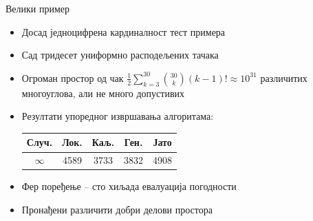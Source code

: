 \documentclass{beamer}
\begin{document}
\begin{frame}{Велики пример}
\begin{itemize}
\item Досад једноцифрена кардиналност тест примера

\item Сад тридесет униформно расподељених тачака

\item Огроман простор од чак $\frac{1}{2} \sum_{k=3}^{30} {30 \choose k} (k-1)! \approx 10^{31}$ различитих многоуглова, али не много допустивих

\item Резултати упоредног извршавања алгоритама:
\begin{center}
\begin{tabular}{| c c c c c |} \hline
Случ. & Лок. & Каљ. & Ген. & Јато\\ \hline
$\infty$ & 4589 & 3733 & 3832 & 4908\\ \hline
\end{tabular}
\end{center}

\item Фер поређење -- сто хиљада евалуација погодности

\item Пронађени различити добри делови простора
\end{itemize}
\end{frame}

{
\begin{frame}
\end{frame}
}
\end{document}
